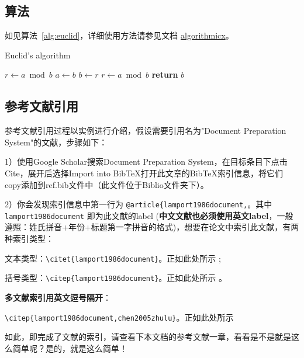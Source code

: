 \subsection{算法}

如见算法~\ref{alg:euclid}，详细使用方法请参见文档 \href{https://ctan.org/pkg/algorithmicx?lang=en}{algorithmicx}。

\begin{algorithm}[!htbp]
    \small
    \caption{Euclid's algorithm}\label{alg:euclid}
    \begin{algorithmic}[1]
        \State $r\gets a\bmod b$
        \State $a\gets b$
        \State $b\gets r$
        \State $r\gets a\bmod b$
        \EndWhile\label{euclidendwhile}
        \State \textbf{return} $b$
        \EndProcedure
    \end{algorithmic}
\end{algorithm}

\subsection{参考文献引用}

参考文献引用过程以实例进行介绍，假设需要引用名为"Document Preparation System"的文献，步骤如下：

1）使用Google Scholar搜索Document Preparation System，在目标条目下点击Cite，展开后选择Import into BibTeX打开此文章的BibTeX索引信息，将它们copy添加到ref.bib文件中（此文件位于Biblio文件夹下）。

2）你会发现索引信息中第一行为 \verb|@article{lamport1986document,|。其中 \verb|lamport1986document| 即为此文献的label (\textbf{中文文献也必须使用英文label}，一般遵照：姓氏拼音+年份+标题第一字拼音的格式)，想要在论文中索引此文献，有两种索引类型：

文本类型：\verb|\citet{lamport1986document}|。正如此处所示 \citet{lamport1986document}; 

括号类型：\verb|\citep{lamport1986document}|。正如此处所示 \citep{lamport1986document}。

\textbf{多文献索引用英文逗号隔开}：

\verb|\citep{lamport1986document,chen2005zhulu}|。正如此处所示 \citep{lamport1986document,chen2005zhulu}

如此，即完成了文献的索引，请查看下本文档的参考文献一章，看看是不是就是这么简单呢？是的，就是这么简单！

